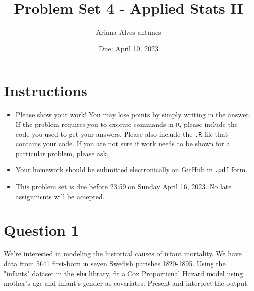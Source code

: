 \documentclass[12pt,letterpaper]{article}
\title{Problem Set 4 - Applied Stats II}
\date{Due: April 10, 2023}
\author{Ariana Alves antunes }
\begin{document}
	\maketitle
	\section*{Instructions}
	\begin{itemize}
	\item Please show your work! You may lose points by simply writing in the answer. If the problem requires you to execute commands in \texttt{R}, please include the code you used to get your answers. Please also include the \texttt{.R} file that contains your code. If you are not sure if work needs to be shown for a particular problem, please ask.
	\item Your homework should be submitted electronically on GitHub in \texttt{.pdf} form.
	\item This problem set is due before 23:59 on Sunday April 16, 2023. No late assignments will be accepted.

	\end{itemize}

	\vspace{.25cm}
\section*{Question 1}
\vspace{.25cm}
\noindent We're interested in modeling the historical causes of infant mortality. We have data from 5641 first-born in seven Swedish parishes 1820-1895. Using the "infants" dataset in the \texttt{eha} library, fit a Cox Proportional Hazard model using mother's age and infant's gender as covariates. Present and interpret the output.


	
\vspace{.5cm}
\noindent  
\end{document}
